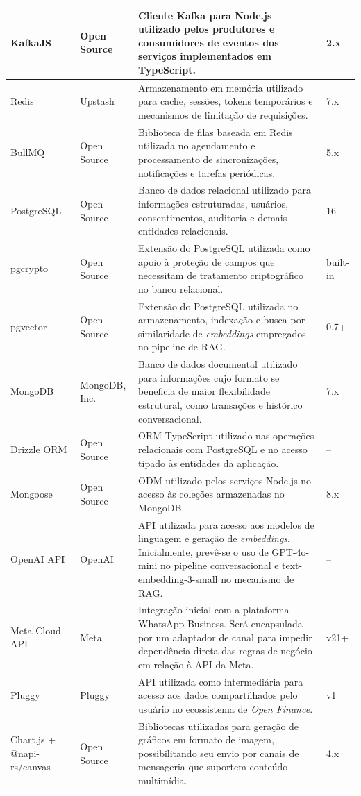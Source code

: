 {\begin{longtable}{|p{3.2cm}|p{2.8cm}|p{6.7cm}|p{1.5cm}|}
KafkaJS & Open Source & Cliente Kafka para Node.js utilizado pelos produtores e consumidores de eventos dos serviços implementados em TypeScript. & 2.x \\ \hline
Redis & Upstash & Armazenamento em memória utilizado para cache, sessões, tokens temporários e mecanismos de limitação de requisições. & 7.x \\ \hline
BullMQ & Open Source & Biblioteca de filas baseada em Redis utilizada no agendamento e processamento de sincronizações, notificações e tarefas periódicas. & 5.x \\ \hline
PostgreSQL & Open Source & Banco de dados relacional utilizado para informações estruturadas, usuários, consentimentos, auditoria e demais entidades relacionais. & 16 \\ \hline
pgcrypto & Open Source & Extensão do PostgreSQL utilizada como apoio à proteção de campos que necessitam de tratamento criptográfico no banco relacional. & built-in \\ \hline
pgvector & Open Source & Extensão do PostgreSQL utilizada no armazenamento, indexação e busca por similaridade de \textit{embeddings} empregados no pipeline de RAG. & 0.7+ \\ \hline
MongoDB & MongoDB, Inc. & Banco de dados documental utilizado para informações cujo formato se beneficia de maior flexibilidade estrutural, como transações e histórico conversacional. & 7.x \\ \hline
Drizzle ORM & Open Source & ORM TypeScript utilizado nas operações relacionais com PostgreSQL e no acesso tipado às entidades da aplicação. & -- \\ \hline
Mongoose & Open Source & ODM utilizado pelos serviços Node.js no acesso às coleções armazenadas no MongoDB. & 8.x \\ \hline
OpenAI API & OpenAI & API utilizada para acesso aos modelos de linguagem e geração de \textit{embeddings}. Inicialmente, prevê-se o uso de GPT-4o-mini no pipeline conversacional e text-embedding-3-small no mecanismo de RAG. & -- \\ \hline
Meta Cloud API & Meta & Integração inicial com a plataforma WhatsApp Business. Será encapsulada por um adaptador de canal para impedir dependência direta das regras de negócio em relação à API da Meta. & v21+ \\ \hline
Pluggy & Pluggy & API utilizada como intermediária para acesso aos dados compartilhados pelo usuário no ecossistema de \textit{Open Finance}. & v1 \\ \hline
Chart.js + @napi-rs/canvas & Open Source & Bibliotecas utilizadas para geração de gráficos em formato de imagem, possibilitando seu envio por canais de mensageria que suportem conteúdo multimídia. & 4.x \\ \hline

\end{longtable}}
